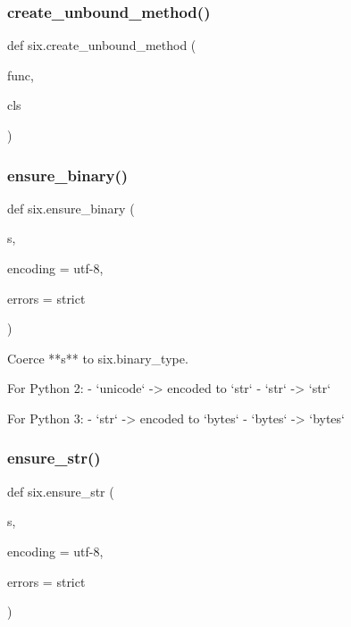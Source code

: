 \mbox{\label{namespacesix_a803bd1806ed54b90ff035fcdca87ac6d}} 
\subsubsection{\texorpdfstring{create\+\_\+unbound\+\_\+method()}{create\_unbound\_method()}}
{\footnotesize\ttfamily def six.\+create\+\_\+unbound\+\_\+method (\begin{DoxyParamCaption}\item[{}]{func,  }\item[{}]{cls }\end{DoxyParamCaption})}

\mbox{\label{namespacesix_a84ffe7d0757c91601ac284101b2d96c6}} 
\subsubsection{\texorpdfstring{ensure\+\_\+binary()}{ensure\_binary()}}
{\footnotesize\ttfamily def six.\+ensure\+\_\+binary (\begin{DoxyParamCaption}\item[{}]{s,  }\item[{}]{encoding = {\ttfamily \textquotesingle{}utf-\/8\textquotesingle{}},  }\item[{}]{errors = {\ttfamily \textquotesingle{}strict\textquotesingle{}} }\end{DoxyParamCaption})}

\begin{DoxyVerb}Coerce **s** to six.binary_type.

For Python 2:
  - `unicode` -> encoded to `str`
  - `str` -> `str`

For Python 3:
  - `str` -> encoded to `bytes`
  - `bytes` -> `bytes`
\end{DoxyVerb}
 \mbox{\label{namespacesix_a14c8c004795ea0da2f1b7650bab174bf}} 
\subsubsection{\texorpdfstring{ensure\+\_\+str()}{ensure\_str()}}
{\footnotesize\ttfamily def six.\+ensure\+\_\+str (\begin{DoxyParamCaption}\item[{}]{s,  }\item[{}]{encoding = {\ttfamily \textquotesingle{}utf-\/8\textquotesingle{}},  }\item[{}]{errors = {\ttfamily \textquotesingle{}strict\textquotesingle{}} }\end{DoxyParamCaption})}

